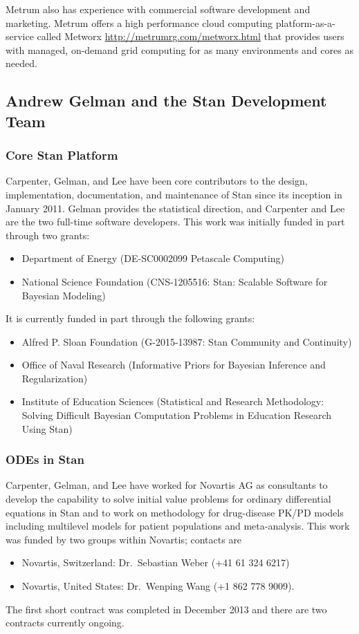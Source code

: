 Metrum also has experience with commercial software development and
marketing. Metrum offers a high performance cloud computing
platform-as-a-service called Metworx
\url{http://metrumrg.com/metworx.html} that provides users with
managed, on-demand grid computing for as many environments and cores
as needed.

\subsection{Andrew Gelman and the Stan Development Team}

\subsubsection{Core Stan Platform}

Carpenter, Gelman, and Lee have been core contributors to the design,
implementation, documentation, and maintenance of Stan since its
inception in January 2011.  Gelman provides the statistical direction,
and Carpenter and Lee are the two full-time software developers.  This
work was initially funded in part through two grants:
%
\begin{itemize}
\item Department of Energy  (DE-SC0002099 Petascale Computing)
\item National Science Foundation (CNS-1205516: Stan: Scalable
  Software for Bayesian Modeling) 
\end{itemize}
%
It is currently funded in part through the following grants:
%
\begin{itemize}
\item Alfred P. Sloan Foundation 
(G-2015-13987: Stan Community and Continuity)
\item Office of Naval Research 
(Informative Priors for Bayesian Inference and Regularization)
\item 
Institute of Education Sciences 
(Statistical and Research Methodology: Solving Difficult Bayesian
Computation Problems in Education Research Using Stan)
\end{itemize}


\subsubsection{ODEs in Stan}

Carpenter, Gelman, and Lee have worked for Novartis AG as consultants
to develop the capability to solve initial value problems for ordinary
differential equations in Stan and to work on methodology for
drug-disease PK/PD models including multilevel models for patient
populations and meta-analysis.  This work was funded by two groups
within Novartis; contacts are
%
\begin{itemize}
\item Novartis, Switzerland: Dr.\ Sebastian Weber (+41 61 324 6217)
\item Novartis, United States: Dr.\ Wenping Wang (+1 862 778 9009).
\end{itemize}
%
The first short contract was completed in December 2013 and there are
two contracts currently ongoing.

